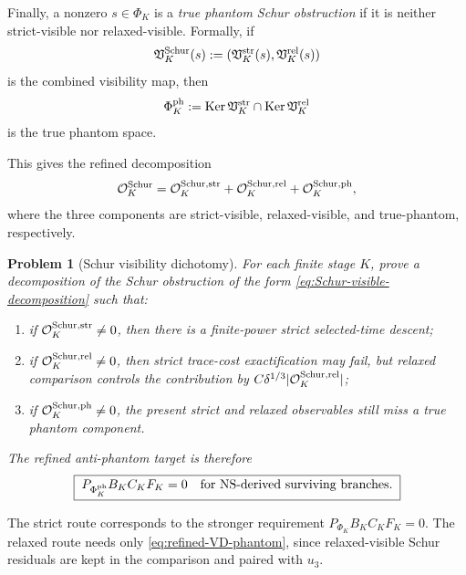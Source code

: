 \documentclass[11pt]{article}
\numberwithin{equation}{section}
\newtheorem{problem}[theorem]{Problem}
\DeclareMathOperator{\Ker}{Ker}
\newcommand{\str}{\mathrm{str}}
\newcommand{\NS}{\mathrm{NS}}
\newcommand{\calO}{\mathcal O}
\begin{document}
Finally, a nonzero \(s\in\Phi_K\) is a \emph{true phantom Schur obstruction} if it is neither strict-visible nor relaxed-visible.  Formally, if
\[
        \mathfrak V_K^{\rm Schur}(s)
        :=(\mathfrak V_K^{\str}(s),\mathfrak V_K^{\rm rel}(s))
\]
is the combined visibility map, then
\begin{equation}\label{eq:true-phantom-space}
        \Phi_K^{\rm ph}
        :=\Ker\mathfrak V_K^{\str}\cap\Ker\mathfrak V_K^{\rm rel}
\end{equation}
is the true phantom space.

This gives the refined decomposition
\begin{equation}\label{eq:Schur-visible-decomposition}
        \calO_K^{\rm Schur}
        =\calO_K^{\rm Schur,str}
        +\calO_K^{\rm Schur,rel}
        +\calO_K^{\rm Schur,ph},
\end{equation}
where the three components are strict-visible, relaxed-visible, and true-phantom, respectively.

\begin{problem}[Schur visibility dichotomy]\label{prob:Schur-visibility-dichotomy}
For each finite stage \(K\), prove a decomposition of the Schur obstruction of the form \eqref{eq:Schur-visible-decomposition} such that:
\begin{enumerate}[label=(\roman*)]
\item if \(\calO_K^{\rm Schur,str}\ne0\), then there is a finite-power strict selected-time descent;
\item if \(\calO_K^{\rm Schur,rel}\ne0\), then strict trace-cost exactification may fail, but relaxed comparison controls the contribution by \(C\delta^{1/3}|\calO_K^{\rm Schur,rel}|\);
\item if \(\calO_K^{\rm Schur,ph}\ne0\), the present strict and relaxed observables still miss a true phantom component.
\end{enumerate}
The refined anti-phantom target is therefore
\begin{equation}\label{eq:refined-VD-phantom}
        \boxed{\;
        P_{\Phi_K^{\rm ph}}B_KC_KF_K=0
        \quad\text{for \(\NS\)-derived surviving branches.}
        \;}
\end{equation}
\end{problem}

The strict route corresponds to the stronger requirement \(P_{\Phi_K}B_KC_KF_K=0\).  The relaxed route needs only \eqref{eq:refined-VD-phantom}, since relaxed-visible Schur residuals are kept in the comparison and paired with \(u_3\).
\end{document}
